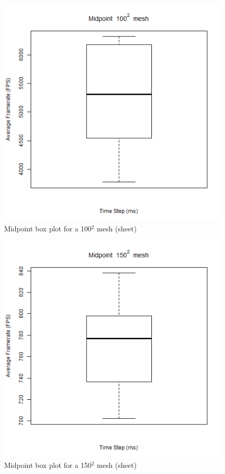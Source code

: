       \begin{figure}
    \begin{center}
      \includegraphics[scale=.9]{Figures/sheet_m_100_box}
    \end{center}
    \caption{Midpoint box plot for a 100$^{2}$ mesh (sheet)}
    \label{fig:m box 100 sheet}
  \end{figure}
  
      \begin{figure}
    \begin{center}
      \includegraphics[scale=.9]{Figures/sheet_m_150_box}
    \end{center}
    \caption{Midpoint box plot for a 150$^{2}$ mesh (sheet)}
    \label{fig:m box 150 sheet}
  \end{figure}
  
